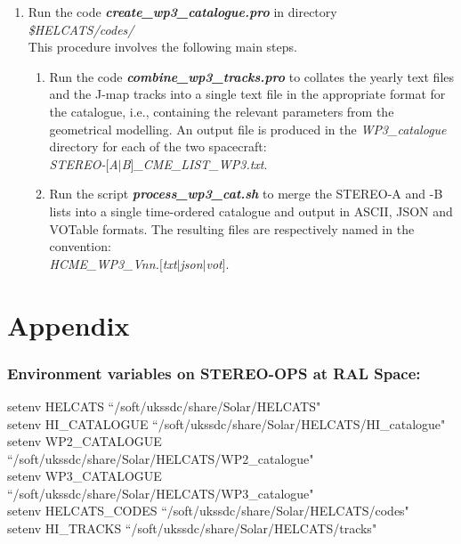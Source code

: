\documentclass[12pt, a4paper, oneside]{article}
\begin{document}
\begin{enumerate}
\item Run the code {\bf \textit{create\_wp3\_catalogue.pro}} in directory\\
	\textit{\$HELCATS/codes/} \\
	This procedure involves the following main steps.

	\begin{enumerate}
	\item Run the code {\bf \textit{combine\_wp3\_tracks.pro}} to collates the yearly text files and the J-map tracks into a single text file in the appropriate format for the catalogue, i.e., containing the relevant parameters from the geometrical modelling. An output file is produced in the \textit{WP3\_catalogue} directory for each of the two spacecraft:\\
	\textit{STEREO-$[$A$|$B$]$\_CME\_LIST\_WP3.txt}.

	\item Run the script {\bf \textit{process\_wp3\_cat.sh}} to merge the STEREO-A and -B lists into a single time-ordered catalogue and output in ASCII, JSON and VOTable formats. The resulting files are respectively named in the convention:\\ \textit{HCME\_WP3\_Vnn.$[$txt$|$json$|$vot$]$}.

	\end{enumerate}



\end{enumerate}



\vspace{1cm}

\section*{\sc Appendix}

\subsubsection*{\sc Environment variables on STEREO-OPS at RAL Space:}
setenv HELCATS ``/soft/ukssdc/share/Solar/HELCATS"
\\
setenv HI\_CATALOGUE ``/soft/ukssdc/share/Solar/HELCATS/HI\_catalogue"
\\
setenv WP2\_CATALOGUE ``/soft/ukssdc/share/Solar/HELCATS/WP2\_catalogue"
\\
setenv WP3\_CATALOGUE ``/soft/ukssdc/share/Solar/HELCATS/WP3\_catalogue"
\\
setenv HELCATS\_CODES ``/soft/ukssdc/share/Solar/HELCATS/codes"
\\
setenv HI\_TRACKS ``/soft/ukssdc/share/Solar/HELCATS/tracks"
\end{document}
